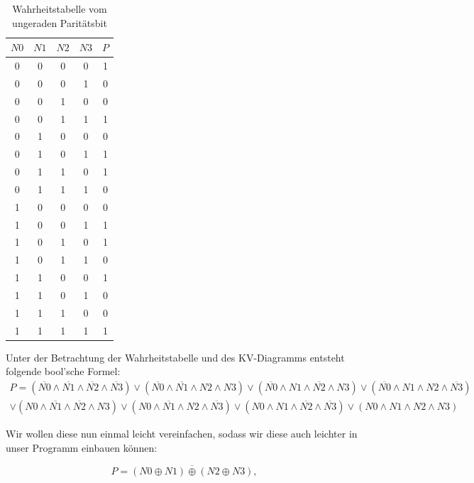 \documentclass{article}
\begin{document}
\newpage
\begin{table}[h]
\begin{center}
\begin{tabular}{c|c|c|c|c}
$N0$ & $N1$ & $N2$ & $N3$ & $P$ \\
\hline
0 & 0 & 0 & 0 & 1\\
0 & 0 & 0 & 1 & 0\\
0 & 0 & 1 & 0 & 0\\
0 & 0 & 1 & 1 & 1\\
0 & 1 & 0 & 0 & 0\\
0 & 1 & 0 & 1 & 1\\
0 & 1 & 1 & 0 & 1\\
0 & 1 & 1 & 1 & 0\\
1 & 0 & 0 & 0 & 0\\
1 & 0 & 0 & 1 & 1\\
1 & 0 & 1 & 0 & 1\\
1 & 0 & 1 & 1 & 0\\
1 & 1 & 0 & 0 & 1\\
1 & 1 & 0 & 1 & 0\\
1 & 1 & 1 & 0 & 0\\
1 & 1 & 1 & 1 & 1\\
\end{tabular}
\caption{Wahrheitstabelle vom ungeraden Paritätsbit}
\end{center}
\end{table}


Unter der Betrachtung der Wahrheitstabelle und des KV-Diagramms entsteht folgende bool'sche Formel:
\begin{align*}
  P = (\overline{N0} \wedge \overline{N1} \wedge \overline{N2} \wedge \overline{N3}) \vee (\overline{N0} \wedge \overline{N1} \wedge N2 \wedge N3) \vee (\overline{N0} \wedge N1 \wedge \overline{N2} \wedge N3) \vee (\overline{N0} \wedge N1 \wedge N2 \wedge \overline{N3}) \\
  \vee (N0 \wedge \overline{N1} \wedge \overline{N2} \wedge N3) \vee (N0 \wedge \overline{N1} \wedge N2 \wedge \overline{N3}) \vee (N0 \wedge N1 \wedge \overline{N2} \wedge \overline{N3}) \vee (N0 \wedge N1 \wedge N2 \wedge N3)
\end{align*}

Wir wollen diese nun einmal leicht vereinfachen, sodass wir diese auch leichter in unser Programm einbauen können:

\begin{equation}
  \label{eq:1}
  P = \overline{(N0 \oplus N1) \oplus (N2 \oplus N3)},
\end{equation}
\end{document}
